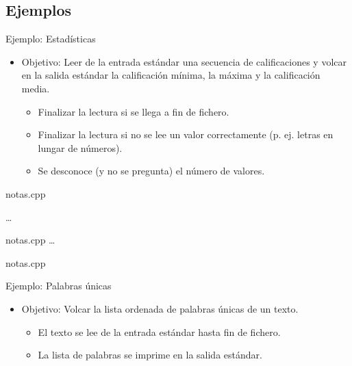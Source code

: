 \subsection{Ejemplos}

\begin{frame}[t]{Ejemplo: Estadísticas}
\begin{itemize}
  \item \alert{Objetivo}: Leer de la entrada estándar una secuencia de calificaciones
    y volcar en la salida estándar la calificación mínima, la máxima y la calificación media.
    \begin{itemize}
      \item Finalizar la lectura si se llega a fin de fichero.
      \item Finalizar la lectura si no se lee un valor correctamente (p. ej. letras en lungar de números).
      \item Se desconoce (y  no se pregunta) el número de valores.
    \end{itemize}
\end{itemize}
\end{frame}

 {

\begin{frame}
\begin{block}{notas.cpp}

\ldots
\end{block}
\end{frame}

\begin{frame}
\begin{block}{notas.cpp}
\ldots

\end{block}
\end{frame}

}

 {
\begin{frame}
\begin{block}{notas.cpp}

\end{block}
\end{frame}
}

\begin{frame}[t]{Ejemplo: Palabras únicas}
\begin{itemize}
  \item \alert{Objetivo}: Volcar la lista ordenada de palabras únicas de un texto.
    \begin{itemize}
      \item El texto se lee de la entrada estándar hasta fin de fichero.
      \item La lista de palabras se imprime en la salida estándar.
    \end{itemize}
\end{itemize}
\end{frame}



